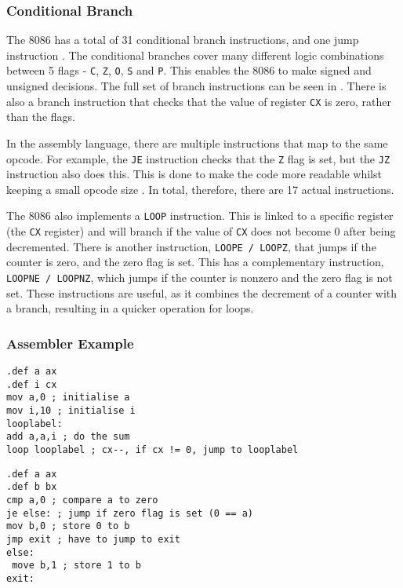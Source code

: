 \documentclass[12pt,a4paper]{article}
\begin{document}
\begin{bibunit}[is-unsrt]
\subsubsection{Conditional Branch}

The 8086 has a total of 31 conditional branch instructions, and one jump instruction \cite{Intel:instructionset}.
The conditional branches cover many different logic combinations between 5 flags - \texttt{C}, \texttt{Z}, \texttt{O}, \texttt{S} and \texttt{P}.
This enables the 8086 to make signed and unsigned decisions.
The full set of branch instructions can be seen in \cite{Intel:condjumps}.
There is also a branch instruction that checks that the value of register \texttt{CX} is zero, rather than the flags. 

In the assembly language, there are multiple instructions that map to the same opcode.
For example, the \texttt{JE} instruction checks that the \texttt{Z} flag is set, but the \texttt{JZ} instruction also does this.
This is done to make the code more readable whilst keeping a small opcode size \cite{Intel:datasheet}.
In total, therefore, there are 17 actual instructions.

The 8086 also implements a \texttt{LOOP} instruction.
This is linked to a specific register (the \texttt{CX} register) and will branch if the value of \texttt{CX} does not become $0$ after being decremented.
There is another instruction, \texttt{LOOPE / LOOPZ}, that jumps if the counter is zero, and the zero flag is set. 
This has a complementary instruction, \texttt{LOOPNE / LOOPNZ}, which jumps if the counter is nonzero and the zero flag is not set.
These instructions are useful, as it combines the decrement of a counter with a branch, resulting in a quicker operation for loops.


%  
\subsubsection{Assembler Example}
\begin{lstlisting}[frame=single,caption=Intel 8086 assembler for listing \ref{ListC},label=intel1]
.def a ax
.def i cx
mov a,0 ; initialise a
mov i,10 ; initialise i
looplabel: 
add a,a,i ; do the sum
loop looplabel ; cx--, if cx != 0, jump to looplabel
\end{lstlisting}

\begin{lstlisting}[frame=single,caption=Intel 8086 assembler for listing \ref{ListC2},label=intel2]
.def a ax
.def b bx
cmp a,0 ; compare a to zero
je else: ; jump if zero flag is set (0 == a)
mov b,0 ; store 0 to b
jmp exit ; have to jump to exit
else:
 move b,1 ; store 1 to b
exit:


\end{lstlisting}
\end{bibunit}
\end{document}
